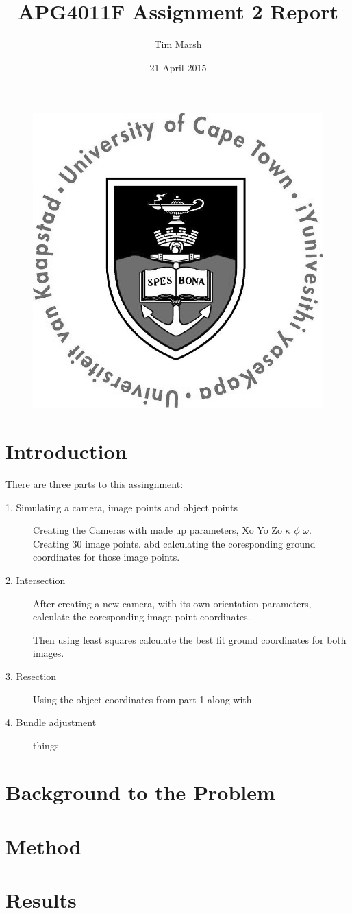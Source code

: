 \documentclass[11pt,a4paper]{article}
\title{APG4011F Assignment 2 Report}
\date{21 April 2015}
\author{Tim Marsh}
\begin{document}
	
	\maketitle
	\begin{figure}[H]
		\centering
		\includegraphics[width=0.7\linewidth]{./UCTcircular_logo1_CMYK}
		\label{fig:UCTcircular_logo1_CMYK}
	\end{figure}
	\newpage
	\tableofcontents
	\listoffigures
	\newpage
	
	
	\section{Introduction}
	
	There are three parts to this assingnment:
	
	\begin{description}
			\item[1. Simulating a camera, image points and object points] Creating the Cameras with made up parameters, Xo Yo Zo $\kappa$ $\phi$ $\omega$. Creating 30 image points. abd calculating the coresponding ground coordinates for those image points.
			
			\item[2. Intersection] After creating a new camera, with its own orientation parameters, calculate the coresponding image point coordinates.
			
			Then using least squares calculate the best fit ground coordinates for both images.
			
			\item[3. Resection] Using the object coordinates from part 1 along with 
			\item[4. Bundle adjustment] things
			
	\end{description}
	


	\section{Background to the Problem}
	

	\section{Method}
	
	
	\section{Results}
	
	
	

	
\end{document}
